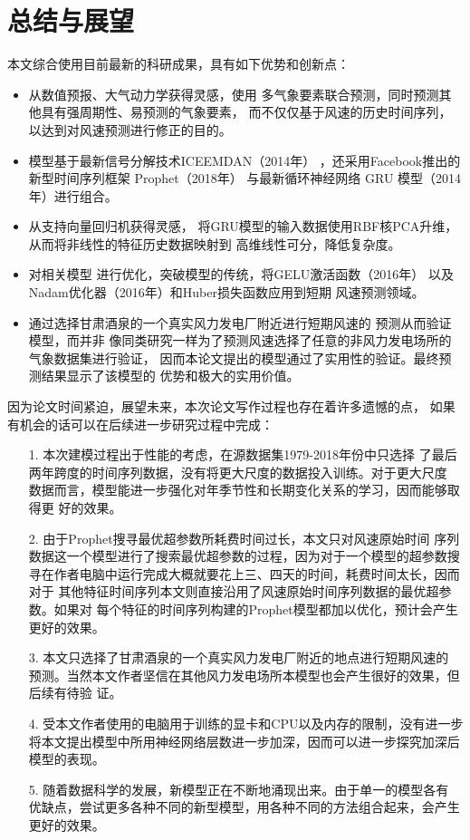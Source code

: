 \documentclass[AutoFakeBold]{LZUThesis}
\begin{document}
\chapter{总结与展望}

本文综合使用目前最新的科研成果，具有如下优势和创新点：

\begin{itemize}
\item 从数值预报、大气动力学获得灵感，使用
多气象要素联合预测，同时预测其他具有强周期性、易预测的气象要素，
而不仅仅基于风速的历史时间序列，以达到对风速预测进行修正的目的。

\item 模型基于最新信号分解技术ICEEMDAN（2014年）
，还采用Facebook推出的新型时间序列框架 Prophet（2018年）
与最新循环神经网络 GRU 模型（2014年）进行组合。

\item 从支持向量回归机获得灵感，
将GRU模型的输入数据使用RBF核PCA升维，从而将非线性的特征历史数据映射到
高维线性可分，降低复杂度。

\item 对相关模型
进行优化，突破模型的传统，将GELU激活函数（2016年）
以及Nadam优化器（2016年）和Huber损失函数应用到短期
风速预测领域。

\item 通过选择甘肃酒泉的一个真实风力发电厂附近进行短期风速的
预测从而验证模型，而并非
像同类研究一样为了预测风速选择了任意的非风力发电场所的气象数据集进行验证，
因而本论文提出的模型通过了实用性的验证。最终预测结果显示了该模型的
优势和极大的实用价值。
\end{itemize}

因为论文时间紧迫，展望未来，本次论文写作过程也存在着许多遗憾的点，
如果有机会的话可以在后续进一步研究过程中完成：

\begin{itemize}
\item[1.] 本次建模过程出于性能的考虑，在源数据集1979-2018年份中只选择
了最后两年跨度的时间序列数据，没有将更大尺度的数据投入训练。对于更大尺度
数据而言，模型能进一步强化对年季节性和长期变化关系的学习，因而能够取得更
好的效果。
\item[2.] 由于Prophet搜寻最优超参数所耗费时间过长，本文只对风速原始时间
序列数据这一个模型进行了搜索最优超参数的过程，因为对于一个模型的超参数搜
寻在作者电脑中运行完成大概就要花上三、四天的时间，耗费时间太长，因而对于
其他特征时间序列本文则直接沿用了风速原始时间序列数据的最优超参数。如果对
每个特征的时间序列构建的Prophet模型都加以优化，预计会产生更好的效果。
\item[3.] 本文只选择了甘肃酒泉的一个真实风力发电厂附近的地点进行短期风速的
预测。当然本文作者坚信在其他风力发电场所本模型也会产生很好的效果，但后续有待验
证。
\item[4.] 受本文作者使用的电脑用于训练的显卡和CPU以及内存的限制，没有进一步
将本文提出模型中所用神经网络层数进一步加深，因而可以进一步探究加深后模型的表现。 
\item[5.] 随着数据科学的发展，新模型正在不断地涌现出来。由于单一的模型各有
优缺点，尝试更多各种不同的新型模型，用各种不同的方法组合起来，会产生更好的效果。 
\end{itemize}
\end{document}
